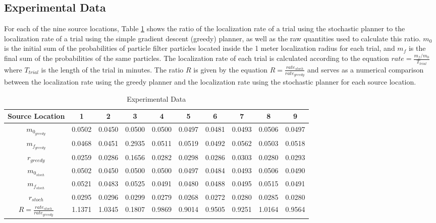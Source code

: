 \documentclass[submit, 12pt]{aiaa-pretty-modified}
\begin{document}
\subsection{Experimental Data}
For each of the nine source locations, Table \ref{tab:data} shows the
ratio of the localization rate of
a trial using the stochastic planner to the localization rate of
a trial using the simple gradient descent (greedy) planner, as well as
the raw quantities used to calculate this ratio. $m_0$ is the initial sum of
the probabilities of particle filter particles located inside the 1
meter localization radius for each trial, and $m_f$ is the final sum
of the probabilities of the same particles. The localization rate of
each trial is calculated according to the equation $rate =
\frac{m_f/m_0}{T_{trial}}$ where $T_{trial}$ is the length of the
trial in minutes.  The ratio $R$ is given by the equation $R =
\frac{rate_{stoch}}{rate_{greedy}}$ and serves as a numerical
comparison between the localization rate using the greedy planner and
the localization rate using the stochastic planner for each source location.

\begin{table}[htb]
\begin{center}
\begin{tabular}{|c||c||c||c||c||c||c||c||c||c|}
\hline
 Source Location & 1 & 2 & 3 & 4 & 5 & 6 & 7 & 8 & 9 \\
\hline \hline
$m_{0_{greedy}}$ & 0.0502 & 0.0450 & 0.0500 & 0.0500 & 0.0497 & 0.0481 & 0.0493 & 0.0506 & 0.0497 \\
\hline
$m_{f_{greedy}}$ & 0.0468 & 0.0451 & 0.2935 & 0.0511 & 0.0519 & 0.0492 & 0.0562 & 0.0503 & 0.0518 \\
\hline
$r_{greedy}$ & 0.0259 & 0.0286 & 0.1656 & 0.0282 & 0.0298 & 0.0286 & 0.0303 & 0.0280 & 0.0293 \\
\hline
$m_{0_{stoch}}$ & 0.0502 & 0.0450 & 0.0500 & 0.0500 & 0.0497 & 0.0484 & 0.0493 & 0.0506 & 0.0490 \\
\hline
$m_{f_{stoch}}$ & 0.0521 & 0.0483 & 0.0525 & 0.0491 & 0.0480 & 0.0488 & 0.0495 & 0.0515 & 0.0491 \\
\hline
$r_{stoch}$ & 0.0295 & 0.0296 & 0.0299 & 0.0279 & 0.0268 & 0.0272 & 0.0280 & 0.0285 & 0.0280 \\
\hline
\hline
$R = \frac{rate_{stoch}}{rate_{greedy}}$  & 1.1371 & 1.0345 & 0.1807 & 0.9869 &
0.9014 & 0.9505  & 0.9251 & 1.0164 & 0.9564\\
\hline
\end{tabular}
\caption{Experimental Data \label{tab:data} }
\end{center}
\end{table}
\end{document}
